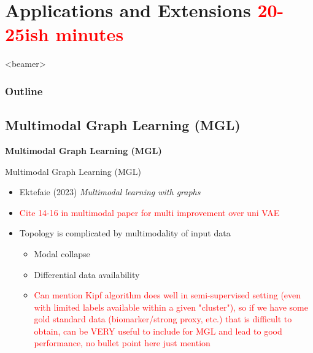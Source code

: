 \documentclass{beamer}
\newcommand{\OutlineRedux}
{
  \begin{frame}<beamer>
    \frametitle{Outline}
    \tableofcontents[currentsection]
  \end{frame}
}
\begin{document}
\section{Applications and Extensions \textcolor{red}{20-25ish minutes}}
\OutlineRedux



\subsection{Multimodal Graph Learning (MGL)}

\begin{frame}{}
    \bf{\Large Multimodal Graph Learning (MGL)}    
\end{frame}

\begin{frame}{Multimodal Graph Learning (MGL)}
\begin{itemize}\setlength\itemsep{6mm}
    \item Ektefaie (2023) {\it Multimodal learning with graphs} \cite{ektefaie_multimodal_2023}
    \item \textcolor{red}{Cite 14-16 in multimodal paper for multi improvement over uni VAE} 
    \item Topology is complicated by multimodality of input data 
    \begin{itemize}
        \item Modal collapse \cite{javaloy_mitigating_2022}
        \item Differential data availability 
        \item \textcolor{red}{Can mention Kipf algorithm does well in semi-supervised setting (even with limited labels available within a given "cluster"), so if we have some gold standard data (biomarker/strong proxy, etc.) that is difficult to obtain, can be VERY useful to include for MGL and lead to good performance, no bullet point here just mention}
    \end{itemize}
\end{itemize}    

\end{frame}
\end{document}
